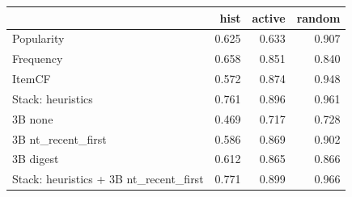 \begin{tabular}{lrrr}
\toprule
 & hist & active & random \\
\midrule
Popularity & 0.625 & 0.633 & 0.907 \\
Frequency & 0.658 & 0.851 & 0.840 \\
ItemCF & 0.572 & 0.874 & 0.948 \\
Stack: heuristics & 0.761 & 0.896 & 0.961 \\
3B none & 0.469 & 0.717 & 0.728 \\
3B nt\_recent\_first & 0.586 & 0.869 & 0.902 \\
3B digest & 0.612 & 0.865 & 0.866 \\
Stack: heuristics + 3B nt\_recent\_first & 0.771 & 0.899 & 0.966 \\
\bottomrule
\end{tabular}
